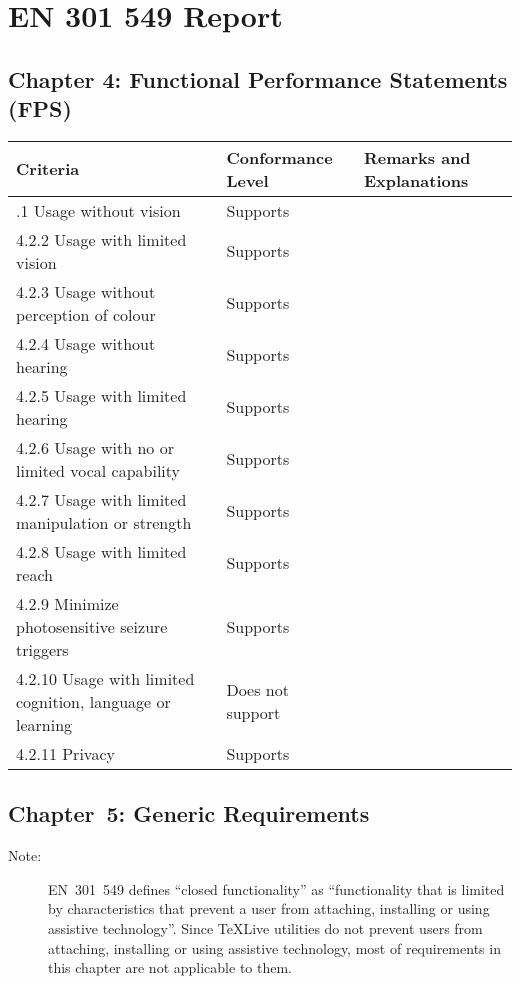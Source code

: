 \documentclass{report}
\begin{document}
\clearpage
\section{EN 301 549 Report}
\label{sec:EN301}

\subsection{Chapter 4: Functional Performance Statements (FPS)}
\label{sec:EN301-3}

\begin{longtable}{p{}<{\RaggedRight}p{}<{\RaggedRight}p{}<{\RaggedRight}}
  \toprule
  Criteria & Conformance Level & Remarks and Explanations \\
  \midrule
  \endhead
  \bottomrule
  \endfoot
  4.2.1 Usage without vision & Supports\\
  4.2.2 Usage with limited vision & Supports\\
  4.2.3 Usage without perception of colour & Supports\\
  4.2.4 Usage without hearing & Supports \\
  4.2.5 Usage with limited hearing & Supports\\
  4.2.6 Usage with no or limited vocal capability & Supports \\
  4.2.7 Usage with limited manipulation or strength & Supports \\ 
  4.2.8 Usage with limited reach & Supports \\ 
  4.2.9 Minimize photosensitive seizure triggers & Supports \\
  4.2.10 Usage with limited cognition, language or learning & Does not
                                                              support \\
  4.2.11 Privacy & Supports\\
\end{longtable}

\subsection{Chapter~5: Generic Requirements}
\label{sec:EN301-5}

\begin{description}
\item[Note:] EN~301~549 defines ``closed functionality'' as
  ``functionality that is limited by characteristics that prevent a
  user from attaching, installing or using assistive technology''.
  Since \TeX Live utilities do not prevent users from attaching,
  installing or using assistive technology, most of requirements in
  this chapter are not applicable to them.
\end{description}
\end{document}
